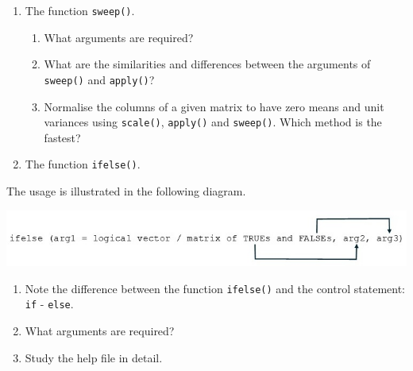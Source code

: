 \documentclass[
]{book}
\begin{document}
\begin{enumerate}
\def\labelenumi{(\alph{enumi})}
\setcounter{enumi}{2}
\item
  The function \texttt{sweep()}.

  \begin{enumerate}
  \def\labelenumii{(\roman{enumii})}
  \item
    What arguments are required?
  \item
    What are the similarities and differences between the arguments of \texttt{sweep()} and \texttt{apply()}?
  \item
    Normalise the columns of a given matrix to have zero means and unit variances using \texttt{scale()}, \texttt{apply()} and \texttt{sweep()}. Which method is the fastest?
  \end{enumerate}
\item
  The function \texttt{ifelse()}.
\end{enumerate}

The usage is illustrated in the following diagram.

\includegraphics[width=1\linewidth]{pics/ifelse}

\begin{enumerate}
\def\labelenumi{(\roman{enumi})}
\item
  Note the difference between the function \texttt{ifelse()} and the control statement: \texttt{if} - \texttt{else}.
\item
  What arguments are required?
\item
  Study the help file in detail.
\end{enumerate}
\end{document}
